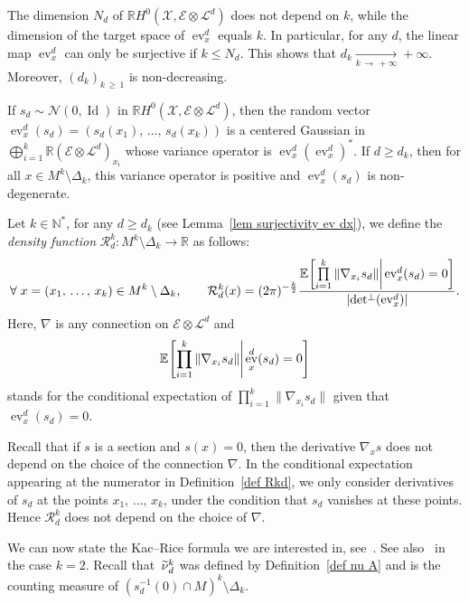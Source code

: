 \documentclass[AHL,Unicode,longabstracts,published]{cedram}
\DeclareMathOperator{\ev}{ev}
\DeclareMathOperator{\Id}{Id}
\newcommand{\E}{\mathcal{E}}
\newcommand{\X}{\mathcal{X}}
\renewcommand{\L}{\mathcal{L}}
\newcommand{\clN}{\mathcal{N}}
\newcommand{\clR}{\mathcal{R}}
\newcommand{\N}{\mathbb{N}}
\newcommand{\R}{\mathbb{R}}
\newcommand{\espcond}[3][]{\mathbb{E}_{#1}\!\left[#2\hspace{-1mm} \mvert \! #3 \right]}
\newcommand{\odet}[1]{\norm{\det\! ^\perp\!\left(#1\right)}}
\newcommand{\mvert}{\mathrel{}\middle|\mathrel{}}
\newcommand{\norm}[1]{\left\lvert #1 \right\rvert}
\newcommand{\Norm}[1]{\left\lVert #1 \right\rVert}
\renewcommand{\H}{H^0(\X,\E \otimes \L^d)}
\renewcommand{\geq}{\geqslant}
\renewcommand{\leq}{\leqslant}
\renewcommand{\tilde}{\widetilde}
\let\oldtilde\tilde
\renewcommand*{\tilde}[1]{\mathchoice{\widetilde{#1}}{\widetilde{#1}}{\oldtilde{#1}}{\oldtilde{#1}}}
\let\oldforall\forall
\renewcommand*{\forall}{\mathrel{\oldforall}}
\begin{document}
\begin{rema}\label{rem dk to infinity}
The dimension $N_d$ of $\R\H$ does not depend on $k$, while the dimension of the target space of $\ev^d_x$ equals $k$. In particular, for any $d$, the linear map $\ev_x^d$ can only be surjective if $k \leq N_d$. This shows that $d_k \xrightarrow[k\, \to\,+\infty]{} +\infty$. Moreover, $(d_k)_{k\,\geq\,1}$ is non-decreasing.
\end{rema}

\begin{rema}\label{rem non degeneracy}
If $s_d \sim \clN(0,\Id)$ in $\R\H$, then the random vector $\ev^d_x(s_d) = (s_d(x_1),\,\dots,\,s_d(x_k))$ is a centered Gaussian in $\bigoplus_{i=1}^k \R(\E \otimes \L^d)_{x_i}$ whose variance operator is $\ev^d_x (\ev^d_x)^*$. If $d \geq d_k$, then for all $x \in M^k \setminus \Delta_k$, this variance operator is positive and $\ev^d_x(s_d)$ is non-degenerate.
\end{rema}

\begin{defi}\label{def Rkd}
Let $k \in \N^*$, for any $d \geq d_k$ (see Lemma~\ref{lem surjectivity ev dx}), we define the \emph{density function} $\clR^k_d:M^k \setminus \Delta_k \to \R$ as follows:
\[
\forall x=(x_1,\,\dots,\,x_k) \in M^k \setminus \Delta_k, \qquad \clR^k_d(x) = (2\pi)^{-\frac{k}{2}}\frac{\espcond{\prod\limits_{i=1}^k \Norm{\nabla_{x_i} s_d}}{\ev_x^d(s_d)=0}}{\odet{\ev^d_x}}.
\]
Here, $\nabla$ is any connection on $\E \otimes \L^d$ and
\[
\espcond{\prod_{i=1}^k \left\|\nabla_{x_i} s_d\right\|}{\ev_x^d(s_d)=0}
\] stands for the conditional expectation of $\prod_{i=1}^k \|\nabla_{x_i} s_d\|$ given that $\ev_x^d(s_d)=0$.
\end{defi}

\begin{rema}\label{rem choice of nabla}
Recall that if $s$ is a section and $s(x)=0$, then the derivative $\nabla_x s$ does not depend on the choice of the connection $\nabla$. In the conditional expectation appearing at the numerator in Definition~\ref{def Rkd}, we only consider derivatives of $s_d$ at the points $x_1,\,\dots,\,x_k$, under the condition that $s_d$ vanishes at these points. Hence $\clR^k_d$ does not depend on the choice of $\nabla$.
\end{rema}

We can now state the Kac--Rice formula we are interested in, see~\cite[Propositions~2.5 and~2.9]{Anc2019}. See also~\cite[Theorem~5.5]{LP2019} in the case $k=2$. Recall that~$\tilde{\nu}_d^k$ was defined by Definition~\ref{def nu A} and is the counting measure of $(s_d^{-1}(0) \cap M)^k \setminus \Delta_k$.
\end{document}

